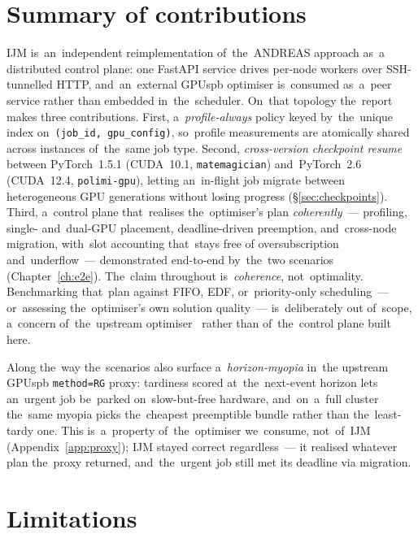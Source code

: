 \section{Summary of contributions}

IJM is~an~independent reimplementation of~the~ANDREAS approach as~a
distributed control plane: one FastAPI service drives per-node workers over
SSH-tunnelled HTTP, and~an~external GPUspb optimiser is~consumed as~a~peer
service rather than embedded in~the~scheduler.  On~that topology the~report
makes three contributions.  First, a~\emph{profile-always} policy keyed
by~the~unique index on~\texttt{(job\_id, gpu\_config)}, so~profile
measurements are atomically shared across instances of~the~same job type.
Second, \emph{cross-version checkpoint resume} between PyTorch~1.5.1
(CUDA~10.1, \texttt{matemagician}) and~PyTorch~2.6 (CUDA~12.4,
\texttt{polimi-gpu}), letting an~in-flight job migrate between heterogeneous
GPU generations without losing progress (\S\ref{sec:checkpoints}).  Third,
a~control plane that~realises the~optimiser's plan \emph{coherently}~---
profiling, single- and~dual-GPU placement, deadline-driven preemption,
and~cross-node migration, with~slot accounting that~stays free of
oversubscription and~underflow~--- demonstrated end-to-end by~the~two
scenarios (Chapter~\ref{ch:e2e}).  The~claim throughout is~\emph{coherence},
not~optimality.  Benchmarking that~plan against FIFO, EDF,
or~priority-only scheduling~--- or~assessing the~optimiser's own solution
quality~--- is~deliberately out of~scope, a~concern of~the~upstream
optimiser~\cite{filippini2023pathrelinking,filippini2024stochastic} rather
than of~the~control plane built here.

Along the~way the~scenarios also surface a~\emph{horizon-myopia} in~the
upstream GPUspb \texttt{method=RG} proxy: tardiness scored at~the~next-event
horizon lets an~urgent job be~parked on~slow-but-free hardware, and~on~a~full
cluster the~same myopia picks the~cheapest preemptible bundle rather than
the~least-tardy one.  This is~a~property of~the~optimiser we~consume,
not~of~IJM (Appendix~\ref{app:proxy}); IJM stayed correct regardless~--- it
realised whatever plan the~proxy returned, and~the~urgent job still met its
deadline via migration.

\section{Limitations}


